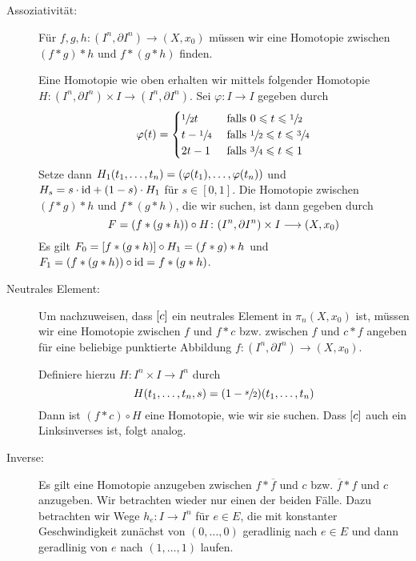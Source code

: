 \begin{beweis}
	\begin{description}
		\item[Assoziativität:] Für $f,g,h \colon (I^n,\partial I^n) \to (X,x_0)$ müssen wir eine Homotopie zwischen $(f * g) * h$ und $f * (g * h)$ finden.
		
		
		Eine Homotopie wie oben erhalten wir mittels folgender Homotopie $H \colon (I^n,\partial I^n) \times I \to (I^n,\partial I^n)$.
		Sei $\varphi \colon I \to I$ gegeben durch
		\[
			\varphi(t) = \begin{cases}
				\sfrac{1}{2}t &\text{ falls } 0 \le t \le \sfrac{1}{2} \\
				t-  \sfrac{1}{4}  &\text{ falls } \sfrac{1}{2} \le t \le \sfrac{3}{4} \\
				2t - 1  &\text{ falls } \sfrac{3}{4} \le t \le 1
			\end{cases}
		\]
		Setze dann $H_1(t_1, \ldots ,t_n) = \enbrace*{\varphi(t_1), \ldots , \varphi(t_n)}$ und $H_s = s \cdot {\id} + (1-s) \cdot H_1$ für $s \in [0,1]$.
		Die Homotopie zwischen $(f * g ) * h$ und $f * (g * h)$, die wir suchen, ist dann gegeben durch
		\[
			F = \enbrace*{f * (g * h)} \circ H \colon (I^n,\partial I^n) \times I \longrightarrow (X,x_0)
		\]
		Es gilt $F_0 = \benbrace*{f * (g * h)} \circ H_1 = (f * g) * h$ und $F_1 = \enbrace*{f * (g * h)} \circ {\id} = f * (g * h)$.
		\item[Neutrales Element:] Um nachzuweisen, dass $\benbrace*{c}$ ein neutrales Element in $\pi_n(X,x_0)$ ist, müssen wir eine Homotopie zwischen $f$ und $f * c$ bzw. zwischen $f$ und $c * f$ angeben für eine beliebige punktierte Abbildung $f \colon (I^n,\partial I^n) \to (X,x_0)$.
		
		
		Definiere hierzu $H \colon I^n \times I \to I^n$ durch
		\[
			H(t_1, \ldots ,t_n,s) = (1- \sfrac{s}{2}) (t_1, \ldots ,t_n)
		\]
		Dann ist $(f * c) \circ H$ eine Homotopie, wie wir sie suchen.
		Dass $\benbrace*{c}$ auch ein Linksinverses ist, folgt analog.
		\item[Inverse:] Es gilt eine Homotopie anzugeben zwischen $f * \overline{f}$ und $c$ bzw. $\overline{f} * f$ und $c$ anzugeben.
		Wir betrachten wieder nur einen der beiden Fälle.
		Dazu betrachten wir Wege $h_e \colon I \to I^n$ für $e \in E$, die mit konstanter Geschwindigkeit zunächst von $(0,\ldots ,0)$ geradlinig nach $e \in E$ und dann geradlinig von $e$ nach $(1,\ldots ,1)$ laufen.
		

\end{description}
\end{beweis}
